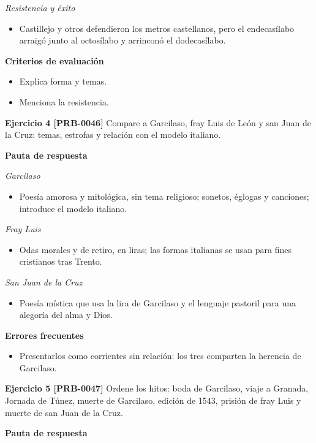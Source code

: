 \documentclass{book}
\begin{document}
\noindent\textit{Resistencia y éxito}
\begin{itemize}
\item Castillejo y otros defendieron los metros castellanos, pero el endecasílabo arraigó junto al octosílabo y arrinconó el dodecasílabo.
\end{itemize}

\noindent\textbf{Criterios de evaluación}
\begin{itemize}
\item Explica forma y temas.
\item Menciona la resistencia.
\end{itemize}

\noindent\textbf{Ejercicio 4 [PRB-0046]}
Compare a Garcilaso, fray Luis de León y san Juan de la Cruz: temas, estrofas y relación con el modelo italiano.


\noindent\textbf{Pauta de respuesta}

\noindent\textit{Garcilaso}
\begin{itemize}
\item Poesía amorosa y mitológica, sin tema religioso; sonetos, églogas y canciones; introduce el modelo italiano.
\end{itemize}

\noindent\textit{Fray Luis}
\begin{itemize}
\item Odas morales y de retiro, en liras; las formas italianas se usan para fines cristianos tras Trento.
\end{itemize}

\noindent\textit{San Juan de la Cruz}
\begin{itemize}
\item Poesía mística que usa la lira de Garcilaso y el lenguaje pastoril para una alegoría del alma y Dios.
\end{itemize}

\noindent\textbf{Errores frecuentes}
\begin{itemize}
\item Presentarlos como corrientes sin relación: los tres comparten la herencia de Garcilaso.
\end{itemize}

\noindent\textbf{Ejercicio 5 [PRB-0047]}
Ordene los hitos: boda de Garcilaso, viaje a Granada, Jornada de Túnez, muerte de Garcilaso, edición de 1543, prisión de fray Luis y muerte de san Juan de la Cruz.


\noindent\textbf{Pauta de respuesta}
\end{document}
